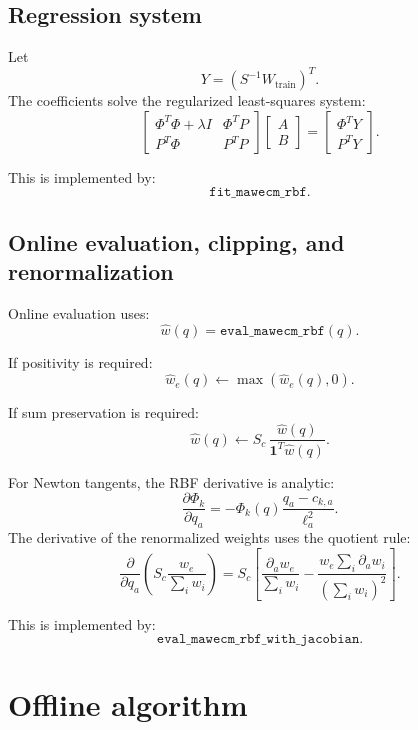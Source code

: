 \documentclass[11pt]{article}
\newcommand{\bone}{\mathbf{1}}
\begin{document}
\subsection{Regression system}

Let
\[
  Y = (S^{-1}W_{\mathrm{train}})^T.
\]
The coefficients solve the regularized least-squares system:
\[
  \begin{bmatrix}
    \Phi^T\Phi+\lambda I & \Phi^T P\\
    P^T\Phi & P^TP
  \end{bmatrix}
  \begin{bmatrix}
    A\\ B
  \end{bmatrix}
  =
  \begin{bmatrix}
    \Phi^TY\\
    P^TY
  \end{bmatrix}.
\]

This is implemented by:
\[
  \texttt{fit\_mawecm\_rbf}.
\]

\subsection{Online evaluation, clipping, and renormalization}

Online evaluation uses:
\[
  \widehat w(q)=\texttt{eval\_mawecm\_rbf}(q).
\]

If positivity is required:
\[
  \widehat w_e(q)\leftarrow\max(\widehat w_e(q),0).
\]

If sum preservation is required:
\[
  \widehat w(q)
  \leftarrow
  S_c\,
  \frac{\widehat w(q)}{\bone^T\widehat w(q)}.
\]

For Newton tangents, the RBF derivative is analytic:
\[
  \frac{\partial \Phi_k}{\partial q_a}
  =
  -\Phi_k(q)\frac{q_a-c_{k,a}}{\ell_a^2}.
\]
The derivative of the renormalized weights uses the quotient rule:
\[
  \frac{\partial}{\partial q_a}
  \left(
    S_c\frac{w_e}{\sum_i w_i}
  \right)
  =
  S_c\left[
    \frac{\partial_a w_e}{\sum_i w_i}
    -
    \frac{w_e\sum_i \partial_a w_i}{(\sum_i w_i)^2}
  \right].
\]

This is implemented by:
\[
  \texttt{eval\_mawecm\_rbf\_with\_jacobian}.
\]

\section{Offline algorithm}
\end{document}
